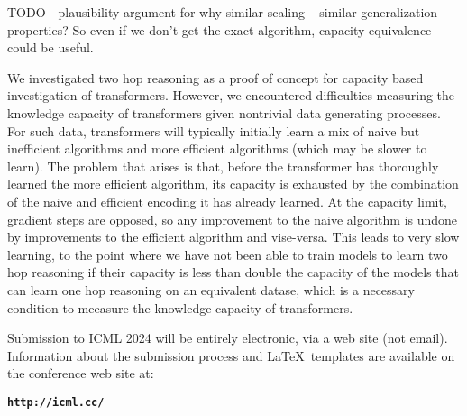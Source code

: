 \documentclass{article}
\theoremstyle{plain}
\theoremstyle{definition}
\theoremstyle{remark}
\begin{document}
TODO - plausibility argument for why similar scaling ~ similar generalization properties? So even if we don't get the exact algorithm, capacity equivalence could be useful.

We investigated two hop reasoning as a proof of concept for capacity based investigation of transformers. However, we encountered difficulties measuring the knowledge capacity of transformers given nontrivial data generating processes. For such data, transformers will typically initially learn a mix of naive but inefficient algorithms and more efficient algorithms (which may be slower to learn). The problem that arises is that, before the transformer has thoroughly learned the more efficient algorithm, its capacity is exhausted by the combination of the naive and efficient encoding it has already learned. At the capacity limit, gradient steps are opposed, so any improvement to the naive algorithm is undone by improvements to the efficient algorithm and vise-versa. This leads to very slow learning, to the point where we have not been able to train models to learn two hop reasoning if their capacity is less than double the capacity of the models that can learn one hop reasoning on an equivalent datase, which is a necessary condition to meeasure the knowledge capacity of transformers.


Submission to ICML 2024 will be entirely electronic, via a web site
(not email). Information about the submission process and \LaTeX\ templates
are available on the conference web site at:
\begin{center}
\textbf{\texttt{http://icml.cc/}}
\end{center}
\end{document}
